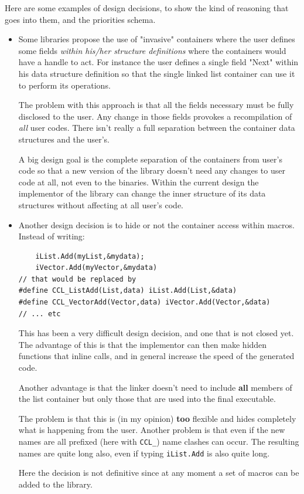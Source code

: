 Here are some examples of design decisions, to show the kind of reasoning that goes into them,
and the priorities schema.
\begin{itemize}
\item Some libraries propose the use of "invasive" containers where the user defines
some fields \textsl{within his/her structure definitions} where the containers
would have a handle to act. For instance the user defines a single field "Next" within
his data structure definition so that the single linked list container can use it
to perform its operations.

The problem with this approach is that all the fields necessary must be fully disclosed
to the user. Any change in those fields provokes a recompilation of \textsl{all} user
codes. There isn't really a full separation between the container data structures
and the user's.

A big design goal is the complete separation of the containers from user's code so that
a new version of the library doesn't need any changes to user code at all, not even
to the binaries. Within the current design the implementor of the library can change
the inner structure of its data structures without affecting at all user's code.

\item Another design decision is to hide or not the container access within macros. Instead
of writing: 
\begin{verbatim}
    iList.Add(myList,&mydata);
    iVector.Add(myVector,&mydata) 
// that would be replaced by
#define CCL_ListAdd(List,data) iList.Add(List,&data)
#define CCL_VectorAdd(Vector,data) iVector.Add(Vector,&data)
// ... etc
\end{verbatim}

This  has been a very difficult design decision, and one that is not closed yet.
The advantage of this is that the implementor can then make hidden functions that
inline calls, and in general increase the speed of the generated code. 

Another advantage is that the linker
doesn't need to include \textbf{all} members of the list container but only
those that are used into the final executable.

The problem is that this is (in my opinion) \textbf{too} flexible and hides
completely what is happening from the user. Another problem is that even if the
new names are all prefixed (here with \verb,CCL_,) name clashes can occur. The
resulting names are quite long also, even if typing \verb,iList.Add, is also
quite long.

Here the decision is not definitive since at any moment a set of macros can be added
to the library.
\end{itemize}
